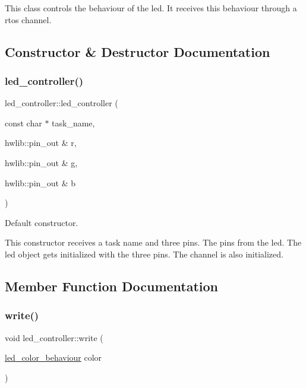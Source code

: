 This class controls the behaviour of the led. It receives this behaviour through a rtos channel. 

\subsection{Constructor \& Destructor Documentation}
\hypertarget{classled__controller_a1ace48b14131910317e79e64df4306f5}{}\label{classled__controller_a1ace48b14131910317e79e64df4306f5} 
\subsubsection{\texorpdfstring{led\+\_\+controller()}{led\_controller()}}
{\footnotesize\ttfamily led\+\_\+controller\+::led\+\_\+controller (\begin{DoxyParamCaption}\item[{const char $\ast$}]{task\+\_\+name,  }\item[{hwlib\+::pin\+\_\+out \&}]{r,  }\item[{hwlib\+::pin\+\_\+out \&}]{g,  }\item[{hwlib\+::pin\+\_\+out \&}]{b }\end{DoxyParamCaption})\hspace{0.3cm}{\ttfamily [inline]}}



Default constructor. 

This constructor receives a task name and three pins. The pins from the led. The led object gets initialized with the three pins. The channel is also initialized. 

\subsection{Member Function Documentation}
\hypertarget{classled__controller_a346241076add950fe9c929d22039e171}{}\label{classled__controller_a346241076add950fe9c929d22039e171} 
\subsubsection{\texorpdfstring{write()}{write()}}
{\footnotesize\ttfamily void led\+\_\+controller\+::write (\begin{DoxyParamCaption}\item[{\hyperlink{structled__color__behaviour}{led\+\_\+color\+\_\+behaviour}}]{color }\end{DoxyParamCaption})\hspace{0.3cm}{\ttfamily [inline]}}




